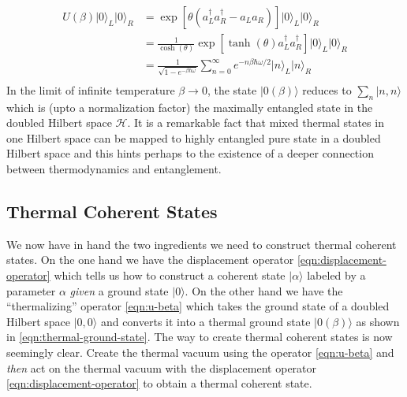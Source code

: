 \documentclass[twocolumn,draft,aps,nofootinbib,nobibnotes,final]{revtex4-2}
\newcommand{\rarrow}{\rightarrow}
\newcommand{\mc}[1]{\mathcal{#1}}
\newcommand{\ket}[1]{\vert #1 \rangle}
\begin{document}
\begin{align}\label{eqn:thermal vacuum}
	U(\beta) \ket{0}_L \ket{0}_R & = \exp\left[\theta(a_{L}^{\dagger} a_{R}^{\dagger} - a_{L}a_{R})\right] \ket{0}_L \ket{0}_R \nonumber \\
	& = \frac{1}{\cosh(\theta)} \exp\left[\tanh(\theta) a^\dagger_L a^\dagger_R \right]\ket{0}_L \ket{0}_R \nonumber \\
	& = \frac{1}{\sqrt{1-e^{-\beta \hbar \omega}}} \sum_{n=0}^\infty e^{-n \beta \hbar \omega/2} \ket{n}_L \ket{n}_R \nonumber \\
\end{align}
In the limit of infinite temperature $ \beta \rarrow 0 $, the state $ \ket{0(\beta)} $ reduces to $ \sum_n \ket{n,n} $ which is (upto a normalization factor) the maximally entangled state in the doubled Hilbert space $ \mc H $. It is a remarkable fact that mixed thermal states in one Hilbert space can be mapped to highly entangled pure state in a doubled Hilbert space and this hints perhaps to the existence of a deeper connection between thermodynamics and entanglement.

\subsection{Thermal Coherent States}\label{sec:thermal-coherent-state-2}

We now have in hand the two ingredients we need to construct thermal coherent states. On the one hand we have the displacement operator \eqref{eqn:displacement-operator} which tells us how to construct a coherent state $ \ket{\alpha} $ labeled by a parameter $ \alpha $ \textit{given} a ground state $ \ket{0} $. On the other hand we have the ``thermalizing'' operator \eqref{eqn:u-beta} which takes the ground state of a doubled Hilbert space $ \ket{0,0} $ and converts it into a thermal ground state $ \ket{0(\beta)} $ as shown in \eqref{eqn:thermal-ground-state}. The way to create thermal coherent states is now seemingly clear. Create the thermal vacuum using the operator \eqref{eqn:u-beta} and \textit{then} act on the thermal vacuum with the displacement operator \eqref{eqn:displacement-operator} to obtain a thermal coherent state.
\end{document}
